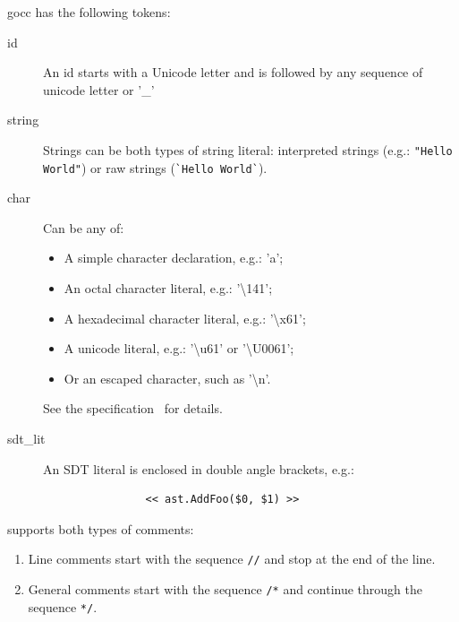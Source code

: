 \documentclass[12pt]{article}
\begin{document}
	gocc has the following tokens:

	\begin{description}
		\item[id] An id starts with a Unicode letter and is followed by any sequence of unicode letter or '\_'

		\item[string] Strings can be both types of \Go string literal: interpreted strings (e.g.: \verb|"Hello World"|) or raw strings (\verb|`Hello World`|).

		\item[char] Can be any of:

			\begin{itemize}
				\item A simple character declaration, e.g.: 'a';
				\item An octal character literal, e.g.: '\textbackslash 141';
				\item A hexadecimal character literal, e.g.: '\textbackslash x61';
				\item A unicode literal, e.g.: '\textbackslash u61' or '\textbackslash U0061';
				\item Or an escaped character, such as '\textbackslash n'.
			\end{itemize}

			See the \Go specification~\cite{gospec} for details.

		\item[sdt\_lit] An SDT literal is enclosed in double angle brackets, e.g.: 
			\begin{verbatim}
				<< ast.AddFoo($0, $1) >>
			\end{verbatim}
	\end{description}

	\gocc supports both types of \Go comments:
	\begin{enumerate}
		\item Line comments start with the sequence \verb|//| and stop at the end of the line.
		\item General comments start with the sequence \verb|/*| and continue through the sequence \verb|*/|.
	\end{enumerate}
		
\end{document}
